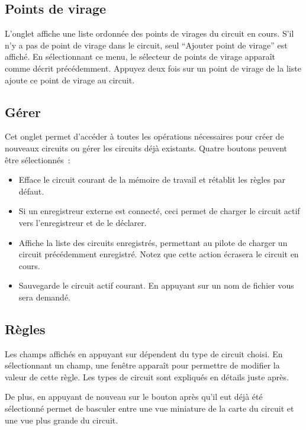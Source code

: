 \subsection*{Points de virage}
L'onglet  affiche une liste ordonnée des points de virages du circuit en cours.
S'il n'y a pas de point de virage dans le circuit, seul
``Ajouter point de virage'' est affiché.
En sélectionnant ce menu, le sélecteur de points de virage apparaît
comme décrit précédemment. Appuyez deux fois sur un point de virage de la liste ajoute ce point de virage au circuit.


\subsection*{Gérer}
Cet onglet permet d'accéder à toutes les opérations nécessaires pour créer de nouveaux circuits ou gérer
les circuits déjà existants.
Quatre boutons peuvent être sélectionnés~:
\begin{itemize}
\item [\bmenuw{Nouveau circuit}] Efface le circuit courant de la mémoire de travail et rétablit 
les règles par défaut.
\item [\bmenuw{Déclarer}] Si un enregistreur externe est connecté, ceci permet de
charger le circuit actif vers l'enregistreur et de le déclarer.
\item [\bmenuw{Circuits enregistrés}] Affiche la liste des circuits enregistrés, permettant au pilote de charger un circuit précédemment enregistré. Notez que cette action écrasera le circuit
en cours.
\item [\bmenuw{Enregistrer}]  Sauvegarde le circuit actif courant.
En appuyant sur  un nom de fichier vous sera demandé.
\end{itemize}

\subsection*{Règles}
Les champs affichés en appuyant sur  
dépendent du type de circuit choisi. En sélectionnant un champ,
une fenêtre apparaît pour permettre de modifier
la valeur de cette règle. Les types de circuit sont expliqués en
détails juste après.

De plus, en appuyant de nouveau sur le bouton  après qu'il eut déjà été sélectionné permet
de basculer entre une vue miniature de la carte du circuit et une vue plus grande du circuit.

